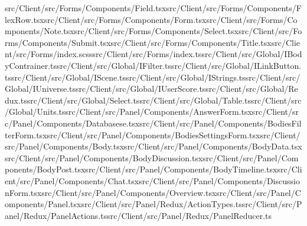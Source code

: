 \documentclass[a4paper,12pt]{article}
\begin{document}
src/Client/src/Forms/Components/Field.tsx\newline src/Client/src/Forms/Components/FlexRow.tsx\newline src/Client/src/Forms/Components/Form.tsx\newline src/Client/src/Forms/Components/Note.tsx\newline src/Client/src/Forms/Components/Select.tsx\newline src/Client/src/Forms/Components/Submit.tsx\newline src/Client/src/Forms/Components/Title.tsx\newline src/Client/src/Forms/index.scss\newline src/Client/src/Forms/index.ts\newline src/Client/src/Global/IBodyContrainer.ts\newline src/Client/src/Global/IFilter.ts\newline src/Client/src/Global/ILinkButton.ts\newline src/Client/src/Global/IScene.ts\newline src/Client/src/Global/IStrings.ts\newline src/Client/src/Global/IUniverse.ts\newline src/Client/src/Global/IUserScore.ts\newline src/Client/src/Global/Redux.ts\newline src/Client/src/Global/Select.ts\newline src/Client/src/Global/Table.ts\newline src/Client/src/Global/Units.ts\newline src/Client/src/Panel/Components/AnswerForm.tsx\newline src/Client/src/Panel/Components/Databasese.tsx\newline src/Client/src/Panel/Components/BodiesFilterForm.tsx\newline src/Client/src/Panel/Components/BodiesSettingsForm.tsx\newline src/Client/src/Panel/Components/Body.tsx\newline src/Client/src/Panel/Components/BodyData.tsx\newline src/Client/src/Panel/Components/BodyDiscussion.tsx\newline src/Client/src/Panel/Components/BodyPost.tsx\newline src/Client/src/Panel/Components/BodyTimeline.tsx\newline src/Client/src/Panel/Components/Chat.tsx\newline src/Client/src/Panel/Components/DiscussionForm.tsx\newline src/Client/src/Panel/Components/Overview.tsx\newline src/Client/src/Panel/Components/Panel.tsx\newline src/Client/src/Panel/Redux/ActionTypes.ts\newline src/Client/src/Panel/Redux/PanelActions.ts\newline src/Client/src/Panel/Redux/PanelReducer.ts\newline 
\end{document}
